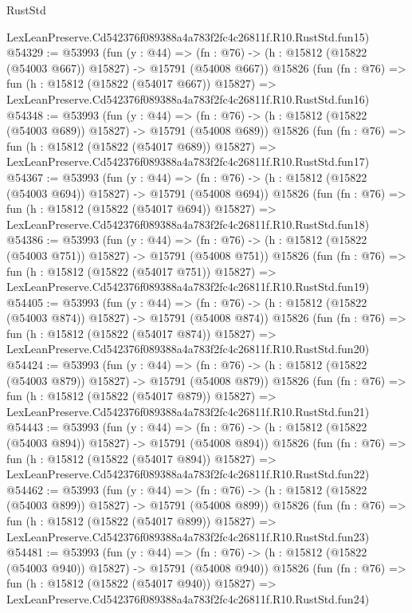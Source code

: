 \begin{lexlean}{RustStd}
\begin{coremodule}
    LexLeanPreserve.Cd542376f089388a4a783f2fc4c26811f.R10.RustStd.fun15)
@54329 := @53993
    (fun (y : @44) =>
    (fn : @76) -> (h : @15812 (@15822 (@54003 @667)) @15827) -> @15791 (@54008 @667))
    @15826
    (fun (fn : @76) =>
    fun (h : @15812 (@15822 (@54017 @667)) @15827) =>
    LexLeanPreserve.Cd542376f089388a4a783f2fc4c26811f.R10.RustStd.fun16)
@54348 := @53993
    (fun (y : @44) =>
    (fn : @76) -> (h : @15812 (@15822 (@54003 @689)) @15827) -> @15791 (@54008 @689))
    @15826
    (fun (fn : @76) =>
    fun (h : @15812 (@15822 (@54017 @689)) @15827) =>
    LexLeanPreserve.Cd542376f089388a4a783f2fc4c26811f.R10.RustStd.fun17)
@54367 := @53993
    (fun (y : @44) =>
    (fn : @76) -> (h : @15812 (@15822 (@54003 @694)) @15827) -> @15791 (@54008 @694))
    @15826
    (fun (fn : @76) =>
    fun (h : @15812 (@15822 (@54017 @694)) @15827) =>
    LexLeanPreserve.Cd542376f089388a4a783f2fc4c26811f.R10.RustStd.fun18)
@54386 := @53993
    (fun (y : @44) =>
    (fn : @76) -> (h : @15812 (@15822 (@54003 @751)) @15827) -> @15791 (@54008 @751))
    @15826
    (fun (fn : @76) =>
    fun (h : @15812 (@15822 (@54017 @751)) @15827) =>
    LexLeanPreserve.Cd542376f089388a4a783f2fc4c26811f.R10.RustStd.fun19)
@54405 := @53993
    (fun (y : @44) =>
    (fn : @76) -> (h : @15812 (@15822 (@54003 @874)) @15827) -> @15791 (@54008 @874))
    @15826
    (fun (fn : @76) =>
    fun (h : @15812 (@15822 (@54017 @874)) @15827) =>
    LexLeanPreserve.Cd542376f089388a4a783f2fc4c26811f.R10.RustStd.fun20)
@54424 := @53993
    (fun (y : @44) =>
    (fn : @76) -> (h : @15812 (@15822 (@54003 @879)) @15827) -> @15791 (@54008 @879))
    @15826
    (fun (fn : @76) =>
    fun (h : @15812 (@15822 (@54017 @879)) @15827) =>
    LexLeanPreserve.Cd542376f089388a4a783f2fc4c26811f.R10.RustStd.fun21)
@54443 := @53993
    (fun (y : @44) =>
    (fn : @76) -> (h : @15812 (@15822 (@54003 @894)) @15827) -> @15791 (@54008 @894))
    @15826
    (fun (fn : @76) =>
    fun (h : @15812 (@15822 (@54017 @894)) @15827) =>
    LexLeanPreserve.Cd542376f089388a4a783f2fc4c26811f.R10.RustStd.fun22)
@54462 := @53993
    (fun (y : @44) =>
    (fn : @76) -> (h : @15812 (@15822 (@54003 @899)) @15827) -> @15791 (@54008 @899))
    @15826
    (fun (fn : @76) =>
    fun (h : @15812 (@15822 (@54017 @899)) @15827) =>
    LexLeanPreserve.Cd542376f089388a4a783f2fc4c26811f.R10.RustStd.fun23)
@54481 := @53993
    (fun (y : @44) =>
    (fn : @76) -> (h : @15812 (@15822 (@54003 @940)) @15827) -> @15791 (@54008 @940))
    @15826
    (fun (fn : @76) =>
    fun (h : @15812 (@15822 (@54017 @940)) @15827) =>
    LexLeanPreserve.Cd542376f089388a4a783f2fc4c26811f.R10.RustStd.fun24)

\end{coremodule}
\end{lexlean}
